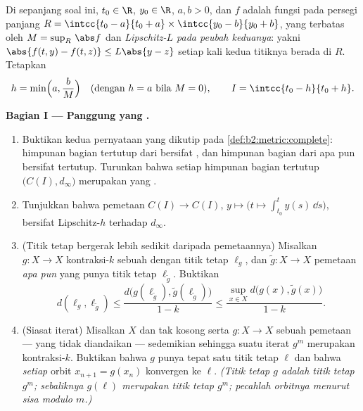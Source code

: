 \begin{problem}
\label{pb:b2:metric:1}
Di sepanjang soal ini, $t_0 \in \R$, $y_0 \in \R$, $a, b > 0$, dan $f$
adalah fungsi  pada persegi panjang $R = \intcc{t_0 - a}{t_0 +
a} \times \intcc{y_0 - b}{y_0 + b}$, yang terbatas oleh $M =
\sup_R\,\abs f$ dan \emph{Lipschitz-$L$ pada peubah keduanya}: yakni
$\abs{f(t, y) - f(t, z)} \leq L\abs{y - z}$ setiap kali kedua titiknya
berada di $R$. Tetapkan
\[
h = \min\Bigl(a, \frac bM\Bigr) \quad (\text{dengan } h = a
\text{ bila } M = 0), \qquad I = \intcc{t_0 - h}{t_0 + h}.
\]

\medskip
\noindent\textbf{Bagian I --- Panggung yang .}
\begin{enumerate}
  \item Buktikan kedua pernyataan yang dikutip pada
        \cref{def:b2:metric:complete}: himpunan bagian tertutup dari
         bersifat , dan himpunan bagian
         dari  apa pun bersifat tertutup. Turunkan
        bahwa setiap himpunan bagian tertutup $\bigl(C(I),
        d_\infty\bigr)$ merupakan  yang .
  \item Tunjukkan bahwa pemetaan $C(I) \to C(I)$, $y \mapsto \bigl(t
        \mapsto \int_{t_0}^{t}y(s)\,\dd s\bigr)$, bersifat
        Lipschitz-$h$ terhadap $d_\infty$.
  \item (Titik tetap bergerak lebih sedikit daripada pemetaannya)
        Misalkan $g \colon X \to X$ kontraksi-$k$ sebuah 
        dengan titik tetap $\ell_g$, dan $\widetilde g \colon X \to X$
        pemetaan \emph{apa pun} yang punya titik tetap
        $\ell_{\widetilde g}$. Buktikan
        \[
        d(\ell_g, \ell_{\widetilde g}) \leq
        \frac{d\bigl(g(\ell_{\widetilde g}),
        \widetilde g(\ell_{\widetilde g})\bigr)}{1 - k}
        \leq \frac{\sup_{x \in X} d\bigl(g(x), \widetilde
        g(x)\bigr)}{1 - k}.
        \]
  \item (Siasat iterat) Misalkan $X$  dan tak kosong serta $g
        \colon X \to X$ sebuah pemetaan --- yang tidak diandaikan
         --- sedemikian sehingga suatu iterat $g^m$ merupakan
        kontraksi-$k$. Buktikan bahwa $g$ punya tepat satu titik tetap
        $\ell$ dan bahwa \emph{setiap} orbit $x_{n+1} = g(x_n)$
        konvergen ke $\ell$. \emph{(Titik tetap $g$ adalah titik tetap
        $g^m$; sebaliknya $g(\ell)$ merupakan titik tetap $g^m$;
        pecahlah orbitnya menurut sisa modulo $m$.)}
\end{enumerate}


\end{problem}
